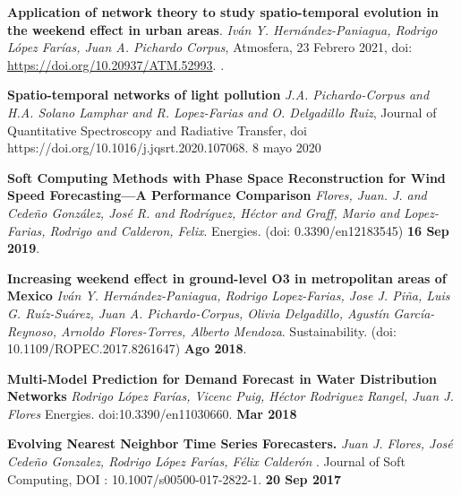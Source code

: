 \documentclass[10pt]{article}
\newenvironment{innerlist}[1][\enskip\textbullet]%
        {\begin{compactitem}[#1]}{\end{compactitem}}
\begin{document}
\begin{innerlist}

\item \textbf{Application of network theory to study spatio-temporal evolution in the weekend effect in urban areas}. \textit{Iván Y. Hernández-Paniagua, Rodrigo López Farías, Juan A. Pichardo Corpus}, Atmosfera, {23 Febrero 2021}, doi: \url{https://doi.org/10.20937/ATM.52993}.
  .

\item \textbf{Spatio-temporal networks of light pollution} \textit{J.A. Pichardo-Corpus and H.A. Solano Lamphar and R. Lopez-Farias and O. Delgadillo Ruiz}, Journal of Quantitative Spectroscopy and Radiative Transfer, doi https://doi.org/10.1016/j.jqsrt.2020.107068. {8 mayo 2020}

\item \textbf{Soft Computing Methods with Phase Space Reconstruction for Wind Speed Forecasting—A Performance Comparison} \textit{{Flores, Juan. J. and Cedeño González, José R. and Rodríguez, Héctor and Graff, Mario and Lopez-Farias, Rodrigo and Calderon, Felix}}. {Energies}. (doi: 0.3390/en12183545) \textbf{16 Sep 2019}.

\item \textbf{Increasing weekend effect in ground-level O3 in metropolitan areas of Mexico} \textit{Iván Y. Hernández-Paniagua, Rodrigo Lopez-Farias, Jose J. Piña, Luis G. Ruíz-Suárez, Juan A. Pichardo-Corpus, Olivia Delgadillo, Agustín García-Reynoso, Arnoldo Flores-Torres, Alberto Mendoza}. {Sustainability}. (doi: 10.1109/ROPEC.2017.8261647) \textbf{Ago 2018}.

\item \textbf{Multi-Model Prediction for Demand Forecast in
Water Distribution Networks} \textit{Rodrigo López Farías, Vicenc Puig, Héctor Rodriguez Rangel, Juan J. Flores} {Energies}. doi:10.3390/en11030660. \textbf{Mar 2018}

\item  \textbf{Evolving Nearest Neighbor Time Series Forecasters.} \textit{Juan J. Flores, José Cede\~no Gonzalez, Rodrigo López Farías, Félix Calderón }.  {Journal of Soft Computing},
DOI : 10.1007/s00500-017-2822-1. \textbf{20 Sep 2017}


\end{innerlist}
\end{document}

